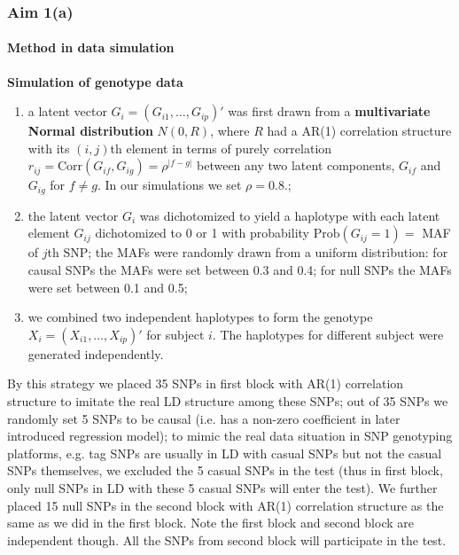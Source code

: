 \documentclass[compress]{beamer}
\begin{document}
\begin{frame}[allowframebreaks]
\frametitle{Aim 1(a)}
\framesubtitle{Method in data simulation}
\textbf{Simulation of genotype data}
\scriptsize
\begin{enumerate}
\item a latent vector $G_i = (G_{i1}, \ldots, G_{ip})'$ was first drawn from  a \textbf{multivariate Normal distribution} $N(0,R)$, where $R$ had a AR(1) correlation structure with its $(i,j)$th element in terms of purely correlation $r_{ij} =\textrm{Corr} (G_{if}, G_{ig}) = \rho ^ { |f - g| }$ between any two latent components, $G_{if}$ and $G_{ig}$ for $f \neq g$. In our simulations we set $\rho = 0.8$.;
\item the latent vector $G_i$ was dichotomized to yield a haplotype with each latent element $G_{ij}$ dichotomized to 0 or 1 with probability $\textrm{Prob} (G_{ij} = 1) = $ MAF of $j$th SNP; the MAFs were randomly drawn from a uniform distribution: for causal SNPs the MAFs were set between 0.3 and 0.4; for null SNPs the MAFs were set between 0.1 and 0.5;
\item we combined two independent haplotypes to form the genotype $X_i = (X_{i1}, \ldots, X_{ip})' $ for subject $i$. The haplotypes for different subject were generated independently.
\end{enumerate}



\framebreak
\begin{wrapfigure}{l}{0.5\textwidth}
\centering
\vspace{-20pt}
\texttt{[image: \{\{figure/genotype\_simulation\_demo]}}}
\caption{ Demo graph of genotype simulation}
\end{wrapfigure}
\scriptsize
By this strategy we placed 35 SNPs in first block with AR(1) correlation structure to imitate the real LD structure among these SNPs; out of 35 SNPs we randomly set 5 SNPs to be causal (i.e. has a non-zero coefficient in later introduced regression model); to mimic the real data situation in SNP genotyping platforms, e.g. tag SNPs are usually in LD with casual SNPs but not the casual SNPs themselves, we excluded the 5 casual SNPs in the test (thus in first block, only null SNPs in LD with these 5 casual SNPs will enter the test). We further placed 15 null SNPs in the second block with AR(1) correlation structure as the same as we did in the first block. Note the first block and second block are independent though. All the SNPs from second block will participate in the test.


\end{frame}
\end{document}
